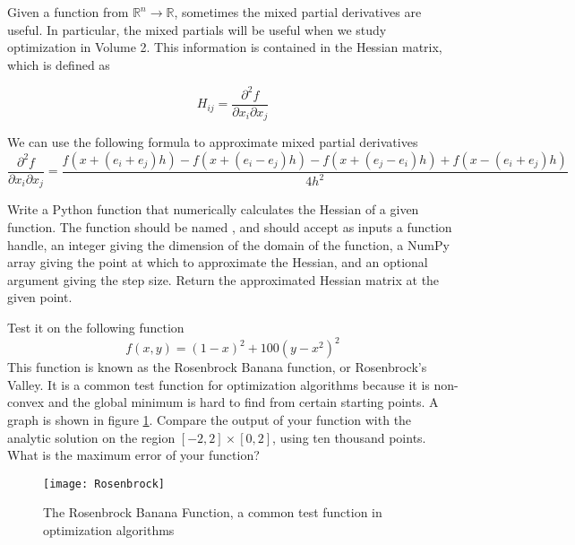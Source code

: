 Given a function from $\mathbb{R}^n \to \mathbb{R}$, sometimes the mixed partial derivatives are useful. In particular, the mixed partials will be useful when we study optimization in Volume 2. This information is contained in the Hessian matrix, which is defined as

\begin{equation*}
H_{ij} = \frac{\partial^2 f}{\partial x_i \partial x_j}
\end{equation*}

We can use the following formula to approximate mixed partial derivatives
\small
\begin{equation*}
\frac{\partial^2 f}{\partial x_i \partial x_j} = \frac{f(x + (e_i + e_j)h) - f(x + (e_i-e_j)h) -f(x + (e_j-e_i)h) + f(x - (e_i + e_j)h)}{4h^2}
\end{equation*}
\normalsize

\begin{problem}
Write a Python function that numerically calculates the Hessian of a given function. 
The function should be named , and should accept as inputs a function handle, 
an integer giving the dimension of the domain of the function, a NumPy 
array giving the point at which to approximate the Hessian, and an optional argument giving the 
step size.
Return the approximated Hessian matrix at the given point.

Test it on the following function
\begin{equation*}
f(x,y) = (1-x)^2 + 100(y-x^2)^2
\end{equation*}
This function is known as the Rosenbrock Banana function, or Rosenbrock's Valley. It is a common test function for optimization algorithms because it is non-convex and the global minimum is hard to find from certain starting points. A graph is shown in figure \ref{Fig:Rosenbrock}. Compare the output of your function with the analytic solution on the region $[-2,2] \times [0,2]$, using ten thousand points. What is the maximum error of your function?
\end{problem}
\begin{figure}
\begin{center}
\texttt{[image: Rosenbrock]}
\caption{The Rosenbrock Banana Function, a common test function in optimization algorithms}
\label{Fig:Rosenbrock}
\end{center}
\end{figure}
